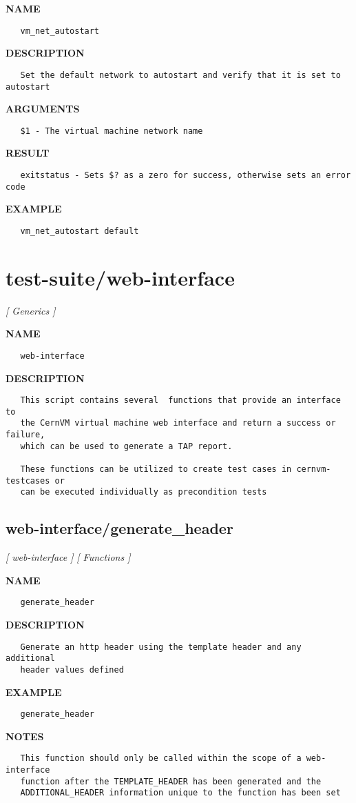 \label{ch:robo42}
\label{ch:virt_interface_vm_net_autostart}
\textbf{NAME}
\begin{verbatim}
   vm_net_autostart
\end{verbatim}
\textbf{DESCRIPTION}
\begin{verbatim}
   Set the default network to autostart and verify that it is set to autostart
\end{verbatim}
\textbf{ARGUMENTS}
\begin{verbatim}
   $1 - The virtual machine network name
\end{verbatim}
\textbf{RESULT}
\begin{verbatim}
   exitstatus - Sets $? as a zero for success, otherwise sets an error code
\end{verbatim}
\textbf{EXAMPLE}
\begin{verbatim}
   vm_net_autostart default
\end{verbatim}
\newpage
\section{test-suite/web-interface}
\textsl{[ Generics ]}

\label{ch:robo32}
\label{ch:test_suite_web_interface}
\textbf{NAME}
\begin{verbatim}
   web-interface
\end{verbatim}
\textbf{DESCRIPTION}
\begin{verbatim}
   This script contains several  functions that provide an interface to
   the CernVM virtual machine web interface and return a success or failure, 
   which can be used to generate a TAP report.

   These functions can be utilized to create test cases in cernvm-testcases or 
   can be executed individually as precondition tests
\end{verbatim}
\newpage
\subsection{web-interface/generate\_header}
\textsl{[ web-interface ]}
\textsl{[ Functions ]}

\label{ch:robo43}
\label{ch:web_interface_generate_header}
\textbf{NAME}
\begin{verbatim}
   generate_header
\end{verbatim}
\textbf{DESCRIPTION}
\begin{verbatim}
   Generate an http header using the template header and any additional 
   header values defined
\end{verbatim}
\textbf{EXAMPLE}
\begin{verbatim}
   generate_header
\end{verbatim}
\textbf{NOTES}
\begin{verbatim}
   This function should only be called within the scope of a web-interface
   function after the TEMPLATE_HEADER has been generated and the 
   ADDITIONAL_HEADER information unique to the function has been set
\end{verbatim}
\newpage
